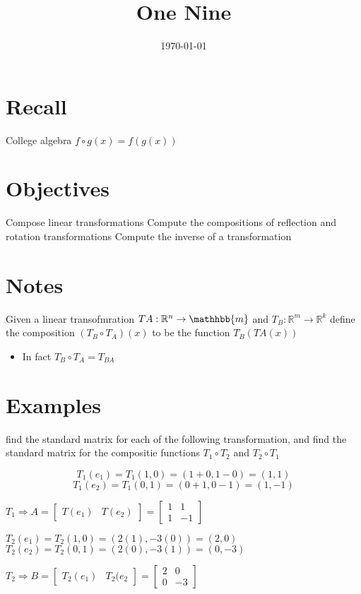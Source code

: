 \documentclass[11pt]{article}
\date{\today}
\title{One Nine}
\begin{document}
\maketitle
\tableofcontents

\section{Recall}
\label{sec:org8f72dbf}
College algebra
\(f \circ{} g(x) = f(g(x))\)
\section{Objectives}
\label{sec:orgad03797}
Compose linear transformations
Compute the compositions of reflection and rotation transformations
Compute the inverse of a transformation
\section{Notes}
\label{sec:org103b354}
Given a linear transofmration \(T{A}: \mathbb{R}^{n} \rightarrow{} \mathhbb{m}\) and \(T_{B} : \mathbb{R}^{m} \rightarrow{} \mathbb{R}^{k}\)  define the composition \((T_{B}\circ{}T_{A})(x)\) to be the function \(T_{B}(T{A}(x))\)
\begin{itemize}
\item In fact \(T_{B}\circ{}T_{A} = T_{BA}\)
\end{itemize}
\section{Examples}
\label{sec:orgcf60b38}
find the standard matrix for each of the following transformation, and find the standard matrix for the compositie functions \(T_{1}\circ{}T_{2}\) and \(T_{2}\circ{}T_{1}\)

\[
T_{1}(e_{1}) = T_{1}(1,0) = (1+0,1-0) = (1,1)
\]
\[
T_{1}(e_{2}) = T_{1}(0,1) = (0+1,0-1) = (1,-1)
\]

\(T_{1} \Rightarrow{} A = \begin{bmatrix}T(e_{1})&T(e_{2})\end{bmatrix} = \begin{bmatrix}1&1\\1&-1\end{bmatrix}\)

\(T_{2}(e_1) = T_{2}(1,0) = (2(1), -3(0)) = (2,0)\)
\(T_{2}(e_2) = T_{2}(0,1) = (2(0), -3(1)) = (0, -3)\)

\(T_{2}\Rightarrow{}B=\begin{bmatrix}T_{2}(e_1)&T_{2}(e_{2}\end{bmatrix}=\begin{bmatrix}2&0\\0&-3\end{bmatrix}\)
\end{document}
